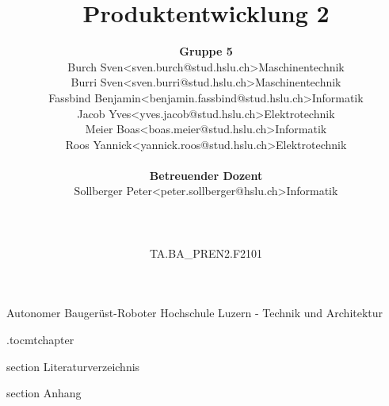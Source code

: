 \documentclass[oneside]{modern}
\title{Produktentwicklung 2}
\author{
\begin{tabular}{ l l l}
  \textbf{Gruppe 5} && \\
  Burch Sven & <sven.burch@stud.hslu.ch> & Maschinentechnik\\
  Burri Sven & <sven.burri@stud.hslu.ch> & Maschinentechnik \\
  Fassbind Benjamin & <benjamin.fassbind@stud.hslu.ch> & Informatik \\
  Jacob Yves & <yves.jacob@stud.hslu.ch> & Elektrotechnik\\
  Meier Boas & <boas.meier@stud.hslu.ch> & Informatik\\
  Roos Yannick & <yannick.roos@stud.hslu.ch> & Elektrotechnik \\
  \\
  \textbf{Betreuender Dozent} && \\
  Sollberger Peter & <peter.sollberger@hslu.ch> & Informatik \\
  \\
  \\
  \\
  TA.BA\_PREN2.F2101 &&\\
\end{tabular}
}
\begin{document}
   \renewcommand{\thesection}{\arabic{section}}
   \makeatletter
   \g@addto@macro{\UrlBreaks}{\UrlOrds}
   \makeatother
   


  \nocite{*}

  \firstpage
    {Autonomer Baugerüst-Roboter}
    {Hochschule Luzern - Technik und Architektur}
    {\theauthor}

  
  
  
  \newpage
  \etocdepthtag.toc{mtchapter}
  \addtableofcontents
  

  \newpage
  
  

  
  
  
  
  
  
  
  
  
  
  
  
  
  
    \newpage
  \listoffigures
  
  \newpage
  \listoftables


  \newpage
  \addglossary

  \newpage
    {section}
    {Literaturverzeichnis}

  \printbibliography[
    heading=subbibliography
  ]

  \newpage
    {section}
    {Anhang}
    
  
\end{document}

